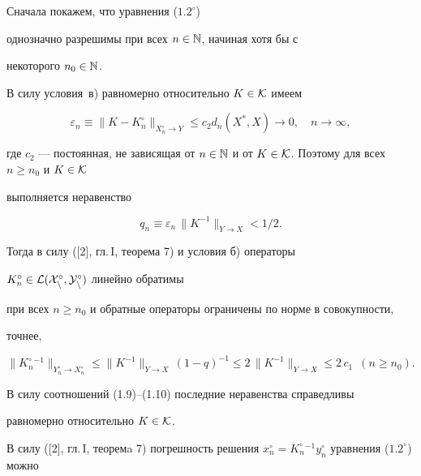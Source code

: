 Сначала покажем, что уравнения ($1.2^\circ$)


однозначно разрешимы при всех $n\in \Bbb N$, начиная хотя бы с


некоторого $n_0\in \Bbb N$.


В силу условия~в) равномерно относительно $K\in \cal K$ имеем


\begin{equation}


\varepsilon_n\equiv \|K-K_n^\circ\|_{X_n^\circ\rightarrow Y}\leq c_2


d_n(X^*,X)\rightarrow 0,\quad n\rightarrow \infty,


\end{equation}


где $c_2$ --- постоянная, не зависящая от $n\in \Bbb N$ и от $K\in


\cal K$. Поэтому для всех $n\geq n_0$ и $K\in \cal K$


выполняется неравенство


\begin{equation}


q_n\equiv \varepsilon_n\, \|K^{-1}\|_{Y\rightarrow X}<1/2.


\end{equation}


Тогда в силу ([2], гл.\,I, теорема 7) и условия б) операторы


$K_n^\circ\in \cal L(X_n^\circ ,Y_n^\circ)$ линейно обратимы


при всех $n\geq n_0$ и обратные операторы ограничены по норме в совокупности,


точнее,


\begin{equation}


\|K_n^\circ {}^{-1}\|_{Y_n^\circ\rightarrow X_n^\circ}\leq


\|K^{-1}\|_{Y\rightarrow X}\, (1-q)^{-1}\leq


2\, \|K^{-1}\|_{Y\rightarrow X}\leq 2\, c_1\ \; (n\geq n_0).


\end{equation}


В силу соотношений (1.9)--(1.10) последние неравенства справедливы


равномерно относительно $K\in \cal K$.





В силу ([2], гл.\,I, теоремa 7) погрешность решения $x_n^\circ =


K_n^\circ{}^{-1} y_n^\circ $ уравнения ($1.2^\circ$) можно


